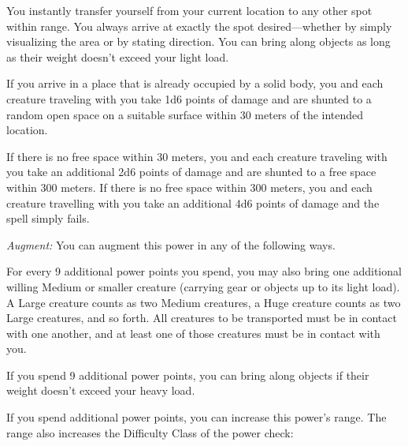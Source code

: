 {
	You instantly transfer yourself from your current location to any other spot within range. You always arrive at exactly the spot desired---whether by simply visualizing the area or by stating direction. You can bring along objects as long as their weight doesn't exceed your light load.

	If you arrive in a place that is already occupied by a solid body, you and each creature traveling with you take 1d6 points of damage and are shunted to a random open space on a suitable surface within 30 meters of the intended location.

	If there is no free space within 30 meters, you and each creature traveling with you take an additional 2d6 points of damage and are shunted to a free space within 300 meters. If there is no free space within 300 meters, you and each creature travelling with you take an additional 4d6 points of damage and the spell simply fails.

	\textit{Augment:} You can augment this power in any of the following ways.
	\begin{enumerate*}
	\item For every 9 additional power points you spend, you may also bring one additional willing Medium or smaller creature (carrying gear or objects up to its light load). A Large creature counts as two Medium creatures, a Huge creature counts as two Large creatures, and so forth. All creatures to be transported must be in contact with one another, and at least one of those creatures must be in contact with you.
	\item If you spend 9 additional power points, you can bring along objects if their weight doesn't exceed your heavy load.
	\item If you spend additional power points, you can increase this power's range. The range also increases the Difficulty Class of the power check: 
	\end{enumerate*}


}